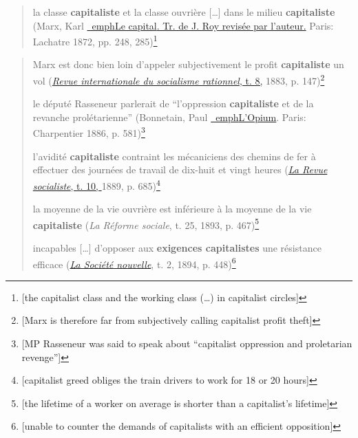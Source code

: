 \documentclass[output=paper]{langsci/langscibook}
\begin{document}
\begin{quote}
la classe \textbf{capitaliste} et la classe ouvrière {[}\ldots{}{]} dans
le milieu \textbf{capitaliste} (Marx, Karl
\href{https://books.google.at/books?id=7ZcBAAAAQAAJ\&pg=PA248\&dq=\%22classe+
capitaliste\%22\&hl=de\&sa=X\&ved=0ahUKEwiS1abDuZnOAhVD7hoKHf02A7IQ6AEIHjAA}{\
emph{Le
capital}. Tr. de J. Roy revisée par l'auteur.} Paris: Lachatre 1872,
pp. 248, 285)\footnote{{[}the capitalist class and the working class
  (\ldots{}) in capitalist circles{]}}
\end{quote}

\begin{quote}
Marx est donc bien loin d'appeler subjectivement le profit
\textbf{capitaliste} un vol
(\href{https://books.google.at/books?id=DLTNAAAAMAAJ\&q=\%22profit+capitaliste\%
22\&dq=\%22profit+capitaliste\%22\&hl=de\&sa=X\&ved=
0ahUKEwjiwdeshJnOAhUJ2BoKHZgCCFkQ6AEINjAC}{\emph{Revue
internationale du socialisme rationnel}, t. 8,} 1883, p. 147)\footnote{{[}Marx
  is therefore far from subjectively calling capitalist profit theft{]}}

le député Rasseneur parlerait de ``l'oppression \textbf{capitaliste} et
de la revanche prolétarienne'' (Bonnetain, Paul
\href{https://books.google.at/books?id=nN3KG9DsCLgC\&pg=PA581\&dq=\%
22capitaliste\%22\&hl=de\&sa=X\&ved=0ahUKEwjnvfbYsZnOAhVEHxoKHSHiDOQQ6AEIUjAI}{\
emph{L'Opium}}.
Paris: Charpentier 1886, p. 581)\footnote{{[}MP Rasseneur was said to
  speak about ``capitalist oppression and proletarian revenge''{]}}

l'avidité \textbf{capitaliste} contraint les mécaniciens des chemins de
fer à effectuer des journées de travail de dix-huit et vingt heures
(\href{https://books.google.at/books?id=wSkrAAAAYAAJ\&q=\%22avidité+capitaliste\%22\&dq=\%22avidité+capitaliste\%22\&hl=de\&sa=X\&ved=
0ahUKEwjUz7j2hpnOAhUFrxoKHQnhAT4Q6AEIHDAA}{\emph{La
Revue socialiste}, t. 10, }1889, p. 685)\footnote{{[}capitalist greed
  obliges the train drivers to work for 18 or 20 hours{]}}

la moyenne de la vie ouvrière est inférieure à la moyenne de la vie
\textbf{capitaliste} (\emph{La Réforme sociale}, t. 25, 1893, p.
467)\footnote{{[}the lifetime of a worker on average is shorter than a
  capitalist's lifetime{]}}

incapables {[}\ldots{}{]} d'opposer aux \textbf{exigences capitalistes}
une résistance efficace
(\href{https://books.google.at/books?id=LU05AQAAMAAJ\&q=\%22exigences+
capitalistes\%22\&dq=\%22exigences+capitalistes\%22\&hl=de\&sa=X\&ved=
0ahUKEwj8yImlvpnOAhXJVRoKHWH4Bo8Q6AEIKDAC}{\emph{La
Société nouvelle}}, t. 2, 1894, p. 448)\footnote{{[}unable to counter
  the demands of capitalists with an efficient opposition{]}}
\end{quote}
\end{document}
